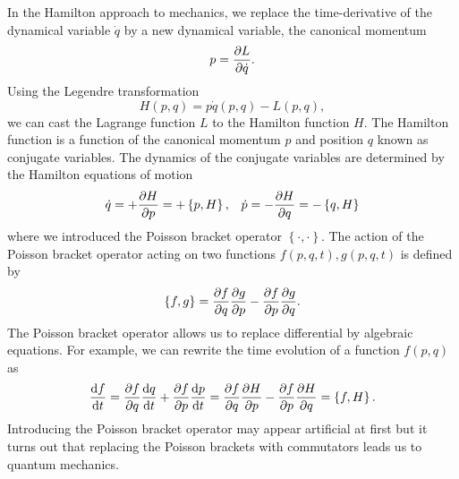 In the Hamilton approach to mechanics, we replace the time-derivative of the dynamical variable $\dot{q}$ by a new dynamical variable, the canonical momentum
\begin{equation}
    p
    =
    \pdv{L}{\dot q}
    \label{eq:canonical_momentum}.
\end{equation}
Using the Legendre transformation
\begin{equation}
    H(p,q)
    =
    p\dot{q}(p,q)
    -
    L(p,q)
    \label{eq:legendre_transform},
\end{equation}
we can cast the Lagrange function $L$ to the Hamilton function $H$.
The Hamilton function is a function of the canonical momentum $p$ and position $q$ known as conjugate variables.
The dynamics of the conjugate variables are determined by the Hamilton equations of motion
\begin{align}
    \dot{q}
    =
    +\pdv{H}{p}
    =
    +\left\{p,H\right\}
    ,&&
    \dot{p}
    =
    -\pdv{H}{q}
    =
    -\left\{q,H\right\}
    \label{eq:hamilton_eom}
\end{align}
where we introduced the Poisson bracket operator $\left\{\cdot,\cdot\right\}$.
The action of the Poisson bracket operator acting on two functions $f(p,q,t),g(p,q,t)$ is defined by
\begin{equation}
    \left\{f,g\right\}
    =
    \pdv{f}{q}\pdv{g}{p}
    -
    \pdv{f}{p}\pdv{g}{q}
    \label{eq:poisson_bracket}.
\end{equation}
The Poisson bracket operator allows us to replace differential by algebraic equations.
For example, we can rewrite the time evolution of a function $f(p,q)$ as
\begin{equation}
    \dv{f}{t}
    =
    \pdv{f}{q}\dv{q}{t}
    +
    \pdv{f}{p}\dv{p}{t}
    =
    \pdv{f}{q}\pdv{H}{p}
    -
    \pdv{f}{p}\pdv{H}{q}
    =
    \left\{f,H\right\}
    \label{eq:hamilton_time_evol}.
\end{equation}
Introducing the Poisson bracket operator may appear artificial at first but it turns out that replacing the Poisson brackets with commutators leads us to quantum mechanics.

